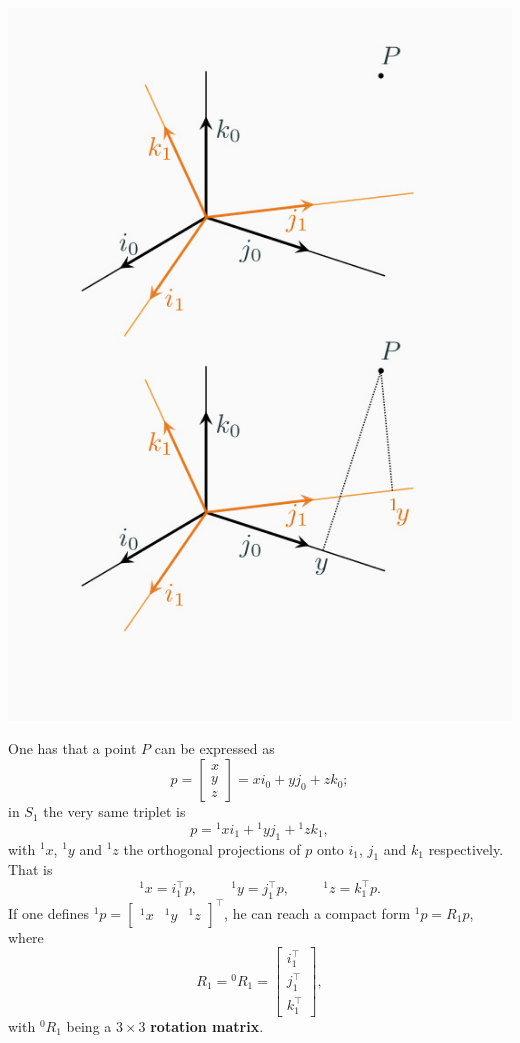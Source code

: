 \documentclass[10pt]{report}
\begin{document}
\begin{center}
\includegraphics[scale=0.3]{./pics/alg/rotation.jpg}
\end{center}

One has that a point \(P\) can be expressed as \[p = \begin{bmatrix} x \\ y \\ z\end{bmatrix} = xi_0 + yj_0 + zk_0;\] in \(S_1\) the very same triplet is \[p = {}^1 xi_1 + {}^1 yj_1 + {}^1 zk_1,\] with \({}^1x\), \({}^1y\) and \({}^1z\) the orthogonal projections of \(p\) onto \(i_1\), \(j_1\) and \(k_1\) respectively. That is $${}^1x = i^\top_1 p, \hspace{1cm}{}^1y = j^\top_1 p, \hspace{1cm}{}^1z = k^\top_1 p.$$ If one defines \({}^1 p = \begin{bmatrix} {}^1 x & {}^1 y & {}^1 z\end{bmatrix}^\top\), he can reach a compact form \({}^1 p = R_1 p\), where $$R_1 = {}^0R_1 = \begin{bmatrix}i^\top_1 \\ j^\top_1 \\ k^\top_1\end{bmatrix},$$ with \({}^0R_1\) being a \(3 \times 3\) \textbf{rotation matrix}.
\end{document}
